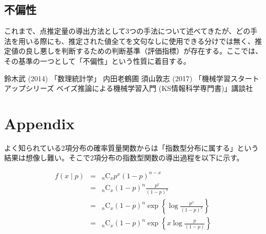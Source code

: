 \documentclass[a4paper,dvipdfmx]{jsarticle}
\begin{document}
\subsection{不偏性}
これまで、点推定量の導出方法として3つの手法について述べてきたが、どの手法を用いる際にも、推定された値全てを文句なしに使用できる分けでは無く、推定値の良し悪しを判断するための判断基準（評価指標）が存在する。ここでは、その基準の一つとして「不偏性」という性質に着目する。







\begin{thebibliography}{99}
   鈴木武 (2014) 「数理統計学」 内田老鶴圃
   須山敦志 (2017) 「機械学習スタートアップシリーズ ベイズ推論による機械学習入門 (KS情報科学専門書)」講談社
\end{thebibliography}


\hrulefill
\section*{Appendix}
よく知られている2項分布の確率質量関数からは「指数型分布に属する」という結果は想像し難い。そこで2項分布の指数型関数の導出過程を以下に示す。

\begin{eqnarray*}
  f(x \mid p) &=& {}_n \mathrm{C} _x p^x (1-p)^{n-x} \\
  &=& {}_n \mathrm{C} _x (1-p)^{n} \frac{p^x}{(1-p)^x} \\
  &=& {}_n \mathrm{C} _x (1-p)^{n} \exp\left\{\log{\frac{p^x}{(1-p)^x}}\right\} \\
  &=& {}_n \mathrm{C} _x (1-p)^{n} \exp\left\{
x \log{\frac{p}{(1-p)}}\right\}
\end{eqnarray*}
\end{document}
